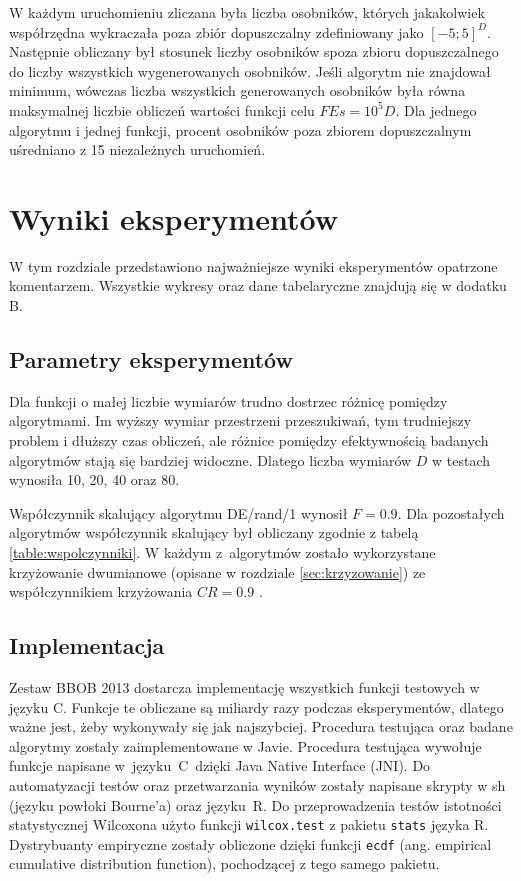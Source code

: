 \documentclass[a4paper,onecolumn,oneside,12pt,wide,floatssmall]{mwrep}
\theoremstyle{definition}
\theoremstyle{plain}%
\theoremstyle{remark}
\begin{document}
W każdym uruchomieniu zliczana była liczba osobników, których jakakolwiek współrzędna wykraczała poza
zbiór dopuszczalny zdefiniowany jako $[-5; 5]^D$. Następnie obliczany był stosunek liczby 
osobników spoza zbioru dopuszczalnego do liczby wszystkich wygenerowanych osobników. Jeśli algorytm
nie znajdował minimum, wówczas liczba wszystkich generowanych osobników była równa maksymalnej
liczbie obliczeń wartości funkcji celu $FEs = 10^5D$. 
Dla jednego algorytmu i jednej funkcji, procent osobników
poza zbiorem dopuszczalnym uśredniano z 15 niezależnych uruchomień.

\chapter{Wyniki eksperymentów}

W tym rozdziale przedstawiono najważniejsze wyniki eksperymentów opatrzone komentarzem.
Wszystkie wykresy oraz dane tabelaryczne znajdują się w dodatku B.

\section{Parametry eksperymentów}

Dla funkcji o małej liczbie wymiarów trudno dostrzec różnicę pomiędzy algorytmami. 
Im wyższy wymiar przestrzeni przeszukiwań,
tym trudniejszy problem i dłuższy czas obliczeń, ale różnice pomiędzy efektywnością
badanych algorytmów stają się bardziej widoczne.
 Dlatego liczba wymiarów $D$ w testach wynosiła 10, 20, 40 oraz 80. 

Współczynnik skalujący algorytmu DE/rand/1 wynosił $F = 0.9$. 
Dla pozostałych algorytmów współczynnik skalujący był obliczany zgodnie z tabelą
\ref{table:wspolczynniki}.
W każdym z~algorytmów zostało wykorzystane krzyżowanie dwumianowe (opisane w rozdziale
\ref{sec:krzyzowanie}) ze
współczynnikiem krzyżowania $CR = 0.9$ \cite{ronkkonen}.

\section{Implementacja}

Zestaw BBOB 2013 dostarcza implementację wszystkich funkcji testowych w języku C. Funkcje te obliczane
są miliardy razy podczas eksperymentów, dlatego ważne jest, żeby wykonywały się jak najszybciej.
Procedura testująca oraz badane algorytmy zostały zaimplementowane w 
Javie. Procedura testująca wywołuje funkcje napisane w~języku~C~dzięki Java Native Interface (JNI).
Do automatyzacji testów oraz przetwarzania wyników zostały napisane skrypty w sh 
(języku powłoki Bourne'a) oraz języku~R. Do przeprowadzenia testów istotności statystycznej Wilcoxona 
użyto funkcji \texttt{wilcox.test} z pakietu \texttt{stats} języka R. Dystrybuanty empiryczne
zostały obliczone dzięki funkcji \texttt{ecdf} (ang. empirical cumulative distribution function),
pochodzącej z tego samego pakietu.
\end{document}
